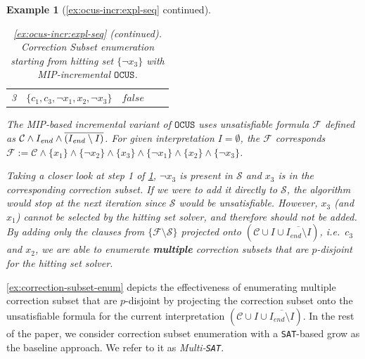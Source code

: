 \documentclass[twoside,11pt]{article}
\newcommand\m[1]{\mathcal{#1}}
\newtheorem{example}{Example}
\newcommand\comment[1]{\marginpar{\tiny #1}}
\renewcommand\comment[1]{#1}
\newcommand{\tias}[1]{{\comment{\color{blue}Tias:#1}}}
\newcommand{\emilio}[1]{{\comment{\color{red}Emilio: #1}}}
\newcommand{\bart}[1]{{\comment{\color{OliveGreen}Bart: #1}}}
\newcommand\Iend{\ensuremath{I_\mathit{end} }\xspace}
\newcommand\formula{\ensuremath{\m{F} }\xspace}
\newcommand\formulac{\ensuremath{\m{C} }\xspace}
\newcommand\mm[1]{\ensuremath{#1}\xspace}
\newcommand\call[1]{\mm{\texttt{#1}}}
\newcommand\sat{\texttt{{SAT}}\xspace}
\newcommand\comus{\mm{\call{OCUS}}}
\begin{document}
\begin{example}[\cref{ex:ocus-incr:expl-seq} continued]
\begin{table}[!h]
\begin{tabular}{lcccc}
			3 & $\{c_1, c_3, \lnot x_1, x_2, \lnot x_3\}$& $\mathit{false}$  &  &                       \\  
		\end{tabular}
		\caption{\textit{\cref{ex:ocus-incr:expl-seq} (continued)}. Correction Subset enumeration starting from hitting set $\{ \lnot x_3\}$ with \emph{MIP-incremental} \comus.}
		\label{tab:example-corr-subsets:ocus-incr}
	\end{table}
	The MIP-based incremental variant of \comus uses unsatisfiable formula \formula defined as $\formulac\land \textbf{\Iend} \land \overline{(\Iend\setminus I)}$. For given interpretation $I = \emptyset$, the $\formula$ corresponds $\formula := \formulac\land \{ x_1\}\land  \{\lnot x_2\}\land \{ x_3\}\land \{ \lnot x_1\}\land  \{ x_2\}\land \{ \lnot x_3\}$.

	Taking a closer look at step 1 of \cref{tab:example-corr-subsets:ocus-incr}, $\lnot x_3$ is present in $\m{S}$ and $x_3$ is in the corresponding correction subset. If we were to add it directly to $\m{S}$, the algorithm would stop at the next iteration since $\m{S}$ would be unsatisfiable. However, $x_3$ (and $x_1$) cannot be selected by the hitting set solver, and therefore should not be added. 
	By adding only the clauses from $\{\formula \setminus \m{S}\}$ projected onto $ (\formulac\cup I \cup \overline{\Iend \setminus I})$, i.e.~$c_3$ and $x_2$, we are able to enumerate \textbf{multiple} correction subsets that are $p$-disjoint for the hitting set solver. %
\end{example}



\cref{ex:correction-subset-enum} depicts the effectiveness of enumerating multiple correction subset that are $p$-disjoint by projecting the correction subset onto the unsatisfiable formula for the current interpretation $(\formulac\cup I \cup \overline{\Iend \setminus I})$. In the rest of the paper, we consider correction subset enumeration with a \sat-based grow as the baseline approach. We refer to it as \emph{Multi-\sat}.
\end{document}
